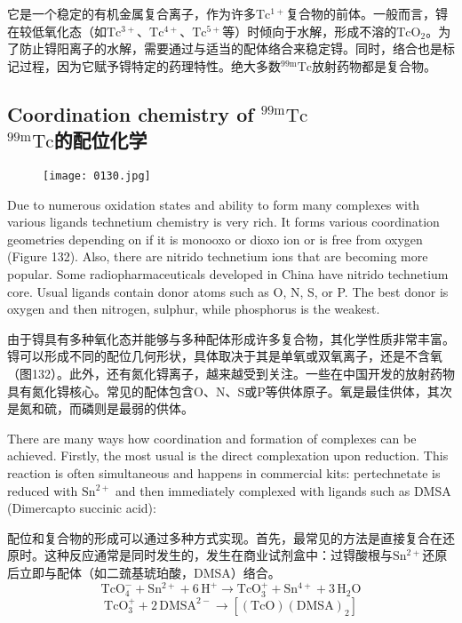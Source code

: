 \documentclass[dvipsnames, svgnames,a4paper,11pt]{article}
\begin{document}
它是一个稳定的有机金属复合离子，作为许多$\mathrm{Tc^{1+}}$复合物的前体。一般而言，锝在较低氧化态（如$\mathrm{Tc^{3+}}$、$\mathrm{Tc^{4+}}$、$\mathrm{Tc^{5+}}$等）时倾向于水解，形成不溶的$\mathrm{TcO_2}$。为了防止锝阳离子的水解，需要通过与适当的配体络合来稳定锝。同时，络合也是标记过程，因为它赋予锝特定的药理特性。绝大多数${}^\mathrm{99m}\mathrm{Tc}$放射药物都是复合物。

\subsection{Coordination chemistry of ${}^\mathrm{99m}\mathrm{Tc}$ \\${}^\mathrm{99m}\mathrm{Tc}$的配位化学}

\begin{figure}[h]
	\centering
    \texttt{[image: 0130.jpg]}    
     \label{fig132}
\end{figure}

Due to numerous oxidation states and ability to form many complexes with various
ligands technetium chemistry is very rich. It forms various coordination geometries
depending on if it is monooxo or dioxo ion or is free from oxygen (Figure 132). Also,
there are nitrido technetium ions that are becoming more popular. Some
radiopharmaceuticals developed in China have nitrido technetium core. Usual
ligands contain donor atoms such as O, N, S, or P. The best donor is oxygen and
then nitrogen, sulphur, while phosphorus is the weakest.

由于锝具有多种氧化态并能够与多种配体形成许多复合物，其化学性质非常丰富。锝可以形成不同的配位几何形状，具体取决于其是单氧或双氧离子，还是不含氧（图132）。此外，还有氮化锝离子，越来越受到关注。一些在中国开发的放射药物具有氮化锝核心。常见的配体包含O、N、S或P等供体原子。氧是最佳供体，其次是氮和硫，而磷则是最弱的供体。

There are many ways how coordination and formation of complexes can be achieved.
Firstly, the most usual is the direct complexation upon reduction. This reaction is
often simultaneous and happens in commercial kits: pertechnetate is reduced with
$\mathrm{Sn^{2+}}$ and then immediately complexed with ligands such as DMSA (Dimercapto
succinic acid):

配位和复合物的形成可以通过多种方式实现。首先，最常见的方法是直接复合在还原时。这种反应通常是同时发生的，发生在商业试剂盒中：过锝酸根与$\mathrm{Sn^{2+}}$还原后立即与配体（如二巯基琥珀酸，DMSA）络合。
\[
\mathrm{TcO_4^-} + \mathrm{Sn^{2+}} + 6 \, \mathrm{H^+} \rightarrow \mathrm{TcO_3^+} + \mathrm{Sn^{4+}} + 3 \, \mathrm{H_2O}
\]
\[
\mathrm{TcO_3^+} + 2 \, \mathrm{DMSA^{2-}} \rightarrow [(\mathrm{TcO})(\mathrm{DMSA})_2]
\]
\end{document}
